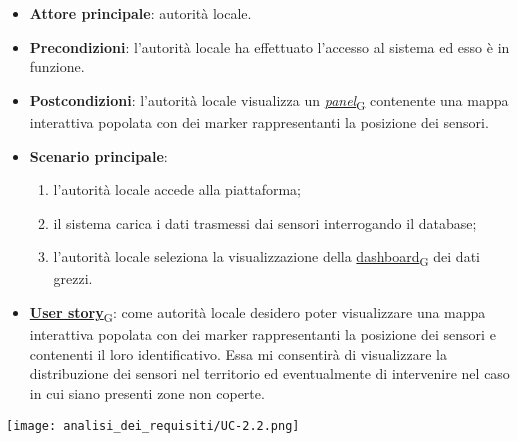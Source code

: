 \newpage

\begin{itemize}
	\item \textbf{Attore principale}: autorità locale.
	\item \textbf{Precondizioni}: l'autorità locale ha effettuato l'accesso al sistema ed esso è in funzione.
	\item \textbf{Postcondizioni}: l'autorità locale visualizza un \href{https://7last.github.io/docs/rtb/documentazione-interna/glossario\#panel}{\textit{panel}\textsubscript{G}} contenente una mappa interattiva
	      popolata con dei marker rappresentanti la posizione dei sensori.
	\item \textbf{Scenario principale}:
	      \begin{enumerate}
		      \item l'autorità locale accede alla piattaforma;
		      \item il sistema carica i dati trasmessi dai sensori interrogando il database;
		      \item l'autorità locale seleziona la visualizzazione della \href{https://7last.github.io/docs/rtb/documentazione-interna/glossario\#dashboard}{dashboard\textsubscript{G}} dei dati grezzi.
	      \end{enumerate}
	\item \href{https://7last.github.io/docs/rtb/documentazione-interna/glossario\#user-story}{\textbf{User story}\textsubscript{G}}: come autorità locale desidero poter visualizzare una mappa interattiva popolata con dei marker rappresentanti
	      la posizione dei sensori e contenenti il loro identificativo. Essa mi consentirà di visualizzare la distribuzione dei sensori nel territorio
	      ed eventualmente di intervenire nel caso in cui siano presenti zone non coperte.
\end{itemize}
\begin{center}
	\texttt{[image: analisi\_dei\_requisiti/UC-2.2.png]}
\end{center}

\newpage

